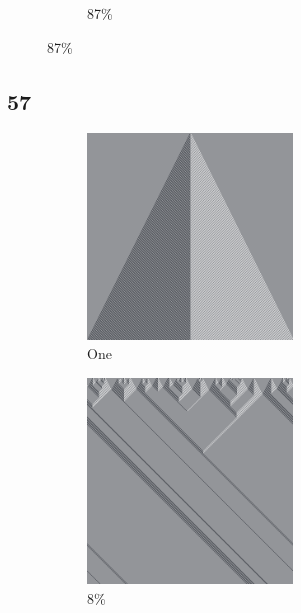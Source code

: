\documentclass[12pt, fleqn]{report}                             %
\theoremstyle{break}                                            %
\begin{document}
\begin{figure}[ht!]
\begin{subfigure}[b]{0.4\linewidth}
          \caption{87\%}
        \end{subfigure}
      \end{figure}


      \clearpage
      \subsection{57}
      \begin{figure}[ht!]
        \centering
        \begin{subfigure}[b]{0.4\linewidth}
          \includegraphics[width=0.6\textwidth]{Images/57/a.png}
          \caption{One}
        \end{subfigure}
        \begin{subfigure}[b]{0.4\linewidth}
          \includegraphics[width=0.6\textwidth]{Images/57/b.png}
          \caption{8\%}
        \end{subfigure}
        \begin{subfigure}[b]{0.4\linewidth}

\end{subfigure}
\end{figure}
\end{document}
